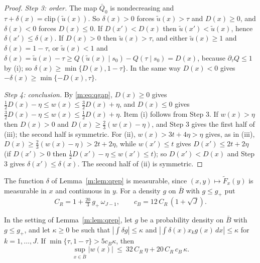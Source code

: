 \begin{proof}
\emph{Step 3: order.} The map $\bar Q_0$ is nondecreasing and $\tau+\delta(x)=\mathrm{clip}(\tilde u(x))$. So $\delta(x)>0$ forces $\tilde u(x)>\tau$ and $D(x)\ge0$, and $\delta(x)<0$ forces $D(x)\le0$. If $D(x')<D(x)$ then $\tilde u(x')<\tilde u(x)$, hence $\delta(x')\le\delta(x)$. If $D(x)>0$ then $\tilde u(x)>\tau$, and either $\tilde u(x)\ge1$ and $\delta(x)=1-\tau$, or $\tilde u(x)<1$ and $\delta(x)=\tilde u(x)-\tau\ge Q(\tilde u(x)\mid s_0)-Q(\tau\mid s_0)=D(x)$, because $\partial_\tau Q\le1$ by (i); so $\delta(x)\ge\min\{D(x),1-\tau\}$. In the same way $D(x)<0$ gives $-\delta(x)\ge\min\{-D(x),\tau\}$.

\emph{Step 4: conclusion.} By \eqref{m:eq:qgap}, $D(x)\ge0$ gives $\frac12D(x)-\eta\le w(x)\le\frac32D(x)+\eta$, and $D(x)\le0$ gives $\frac32D(x)-\eta\le w(x)\le\frac12D(x)+\eta$. Item (i) follows from Step 3. If $w(x)>\eta$ then $D(x)>0$ and $D(x)\ge\frac23(w(x)-\eta)$, and Step 3 gives the first half of (iii); the second half is symmetric. For (ii), $w(x)>3t+4\eta>\eta$ gives, as in (iii), $D(x)\ge\frac23(w(x)-\eta)>2t+2\eta$, while $w(x')\le t$ gives $D(x')\le2t+2\eta$ (if $D(x')>0$ then $\frac12D(x')-\eta\le w(x')\le t$); so $D(x')<D(x)$ and Step 3 gives $\delta(x')\le\delta(x)$. The second half of (ii) is symmetric.
\end{proof}

The function $\delta$ of Lemma~\ref{m:lem:qrep} is measurable, since $(x,y)\mapsto\tilde F_x(y)$ is measurable in $x$ and continuous in $y$. For a density $g$ on $\bar B$ with $g\le g_+$ put
\[
C_R=1+\tfrac{20}3\,g_+\,\omega_{J-1},\qquad c_B=12\,C_R\,(1+\sqrt J).
\]

\begin{lemma}\label{m:lem:qbary}
In the setting of Lemma~\ref{m:lem:qrep}, let $g$ be a probability density on $\bar B$ with $g\le g_+$, and let $\kappa\ge0$ be such that $|\int\delta g|\le\kappa$ and $|\int\delta(x)x_kg(x)\,dx|\le\kappa$ for $k=1,\dots,J$. If $\min\{\tau,1-\tau\}>5c_B\kappa$, then
\[
\sup_{x\in\bar B}|w(x)|\ \le\ 32\,C_R\,\eta+20\,C_R\,c_B\,\kappa .
\]
\end{lemma}

